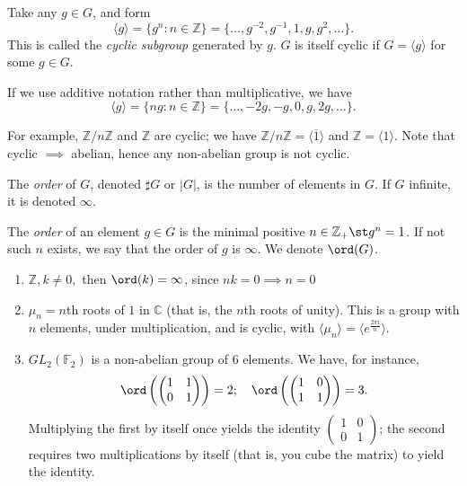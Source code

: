 \documentclass[12pt,oneside]{article}
\begin{document}
\begin{definition}
    Take any $g \in G$, and form \[\langle g \rangle = \{g^{n} : n \in \mathbb{Z}\} = \{\dots, g^{-2}, g^{-1}, 1, g, g^{2}, \dots\}.\] This is called the \emph{cyclic subgroup} generated by $g$. $G$ is itself cyclic if $G = \langle g \rangle$ for some $g \in G$.

    If we use additive notation rather than multiplicative, we have \[\langle g \rangle = \{n g : n \in \mathbb{Z}\} = \{\dots, -2 g, - g, 0, g, 2g, \dots\}.\]
\end{definition}

\begin{example}
  For example, $\mathbb{Z}/n\mathbb{Z}$ and $\mathbb{Z}$ are cyclic; we have $\mathbb{Z}/n\mathbb{Z} = \langle \overline{1}\rangle$ and $\mathbb{Z} = \langle 1 \rangle$. Note that cyclic $\implies$ abelian, hence any non-abelian group is not cyclic.
\end{example}

\begin{definition}[Order of $g/G$]
  The \emph{order} of $G$, denoted $\sharp G$ or $|G|$, is the number of elements in $G$. If $G$ infinite, it is denoted $\infty$.

  The \emph{order} of an element $g \in G$ is the minimal positive $n \in \mathbb{Z}_+ \st g^{n} = 1$. If not such $n$ exists, we say that the order of $g$ is $\infty$. We denote $\ord(G)$.
\end{definition}

\begin{example}[Orders]
\begin{enumerate}
  \item $\mathbb{Z}, k \neq 0,$ then $\ord (k) = \infty$, since $nk = 0 \implies n = 0$
  \item $\mu_n = n$th roots of $1$ in $\mathbb{C}$ (that is, the $n$th roots of unity). This is a group with $n$ elements, under multiplication, and is cyclic, with $\langle\mu_n \rangle = \langle e^{\frac{2\pi i}{n}} \rangle$.
  \item $GL_2 (\mathbb{F}_2)$ is a non-abelian group of $6$ elements. We have, for instance,
  \[
  \ord \left(\begin{pmatrix}
    1 & 1\\
    0 & 1
  \end{pmatrix}\right) = 2; \quad \ord \left(\begin{pmatrix}
    1 & 0\\
    1 & 1
  \end{pmatrix}\right) = 3.
  \]
  Multiplying the first by itself once yields the identity $\begin{pmatrix}
    1 & 0 \\
    0 & 1
  \end{pmatrix}$; the second requires two multiplications by itself (that is, you cube the matrix) to yield the identity.
\end{enumerate}  
\end{example}
\end{document}

